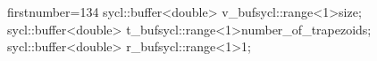 \begin{cppcode*}{firstnumber=134}
        sycl::buffer<double> v_buf{sycl::range<1>{size}};
        sycl::buffer<double> t_buf{sycl::range<1>{number_of_trapezoids}};
        sycl::buffer<double> r_buf{sycl::range<1>{1}};
\end{cppcode*}
